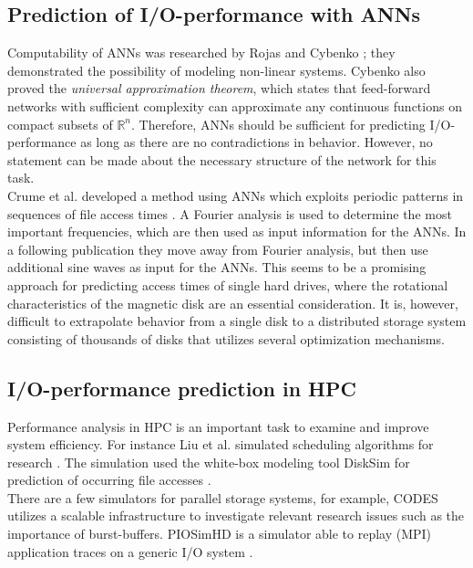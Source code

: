 \documentclass{superfri}
\begin{document}
\subsection{Prediction of I/O-performance with ANNs}
Computability of ANNs was researched by Rojas \cite{Rojas:1996:NNS:235222} and Cybenko \cite{cybenko:mcss}; they demonstrated the  possibility of modeling non-linear systems. 
Cybenko also proved the \textit{universal approximation theorem}, which states that feed-forward networks with sufficient complexity can approximate any continuous functions on compact subsets of $\mathbb{R}^n$.
Therefore, ANNs should be sufficient for predicting I/O-performance as long as there are no contradictions in behavior. 
However, no statement can be made about the necessary structure of the network for this task.\\
Crume et al. developed a method using ANNs which exploits periodic patterns in sequences of file access times \cite{Crume:2013:FML:2538542.2538561}.
A Fourier analysis is used to determine the most important frequencies, which are then used as input information for the ANNs.
In a following publication \cite{crumelatent} they move away from Fourier analysis, but then use additional sine waves as input for the ANNs.
This seems to be a promising approach for predicting access times of single hard drives, where the rotational characteristics of the magnetic disk are an essential consideration. 
It is, however, difficult to extrapolate behavior from a single disk to a distributed storage system consisting of thousands of disks that utilizes several optimization mechanisms.

\subsection{I/O-performance prediction in HPC}
Performance analysis in HPC is an important task to examine and improve system efficiency.
For instance Liu et al. simulated scheduling algorithms for research \cite{liu2011towards}. 
The simulation used the white-box modeling tool DiskSim for prediction of occurring file accesses \cite{Bucy08thedisksim}.\\
There are a few simulators for parallel storage systems, for example, CODES\,\cite{cope2011codes} utilizes a scalable infrastructure to investigate relevant research issues such as the importance of burst-buffers.
PIOSimHD is a simulator able to replay (MPI) application traces on a generic I/O system \cite{kunkel2013simulating}.
\end{document}
